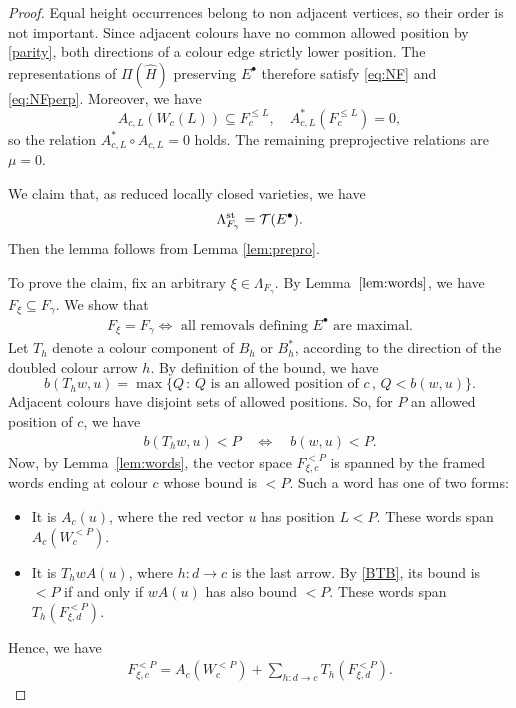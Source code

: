 \documentclass[11pt,reqno]{amsart}
\theoremstyle{definition}
\theoremstyle{remark}
\begin{document}
\begin{proof}
Equal height occurrences belong to non adjacent vertices, so their order is not important.
Since adjacent colours have no common allowed position by \eqref{parity},
both directions of a colour edge strictly lower position.
The representations of $\Pi(\widehat H)$ preserving $E^\bullet$ therefore satisfy 
\eqref{eq:NF} and \eqref{eq:NFperp}. Moreover, we have
$$A_{c,L}(W_c(L))\subseteq F_c^{\leqslant L}
,\quad
A^*_{c,L}(F_c^{\leqslant L})=0,$$ so the relation
$A^*_{c,L}\circ A_{c,L}=0$ holds. The remaining preprojective
relations are  $\mu=0$.

We claim that, as reduced locally closed varieties, we have
\begin{align}\label{LT}\Lambda_{F_\gamma}^{\rm st}=\mathcal T(E^\bullet).\end{align}
Then the lemma follows from Lemma \ref{lem:prepro}.

To prove the claim,
fix an arbitrary \(\xi\in\Lambda_{F_\gamma}\). 
By Lemma~\(\ref{lem:words}\), we have \(F_\xi\subseteq F_\gamma\). We show that 
\begin{align}\label{IFF}F_\xi=F_\gamma\iff \text{ all removals defining \(E^\bullet\) are maximal}.\end{align}
Let $T_h$  denote a colour component of \(B_h\) or \(B_h^*\), according to the direction of the doubled colour arrow \(h\).
By definition of the bound, we have
\[
b(T_hw,u)
=
\max\{Q\,:\,Q\text{ is an allowed position of }c\,,\, Q<b(w,u)\}.
\]
Adjacent colours have disjoint sets of allowed positions.
So, for \(P\) an allowed position of \(c\), we have
\begin{align}\label{BTB}
b(T_hw,u)<P
\quad\Longleftrightarrow\quad
b(w,u)<P.
\end{align}
Now, by Lemma~\ref{lem:words}, the vector space $F_{\xi,c}^{<P}$ is spanned by the framed words ending at colour \(c\) 
whose bound is \(<P\).
Such a word has one of two forms:
\begin{itemize}[leftmargin=8mm]
\item It is \(A_c(u)\), where the red vector \(u\) has position \(L<P\). These words span \(A_c(W_c^{<P})\).
\item It is \(T_hwA(u)\), where \(h:d\to c\) is the last arrow. 
By \eqref{BTB}, its bound  is \(<P\) if and only if \(wA(u)\) has also bound \(<P\). 
These words span \(T_h(F_{\xi,d}^{<P})\).
\end{itemize}
Hence, we have
\begin{align}\label{FAT}
F_{\xi,c}^{<P}=A_c(W_c^{<P})+
       \sum_{h:d\to c}T_h(F_{\xi,d}^{<P}).
\end{align}


\end{proof}
\end{document}
